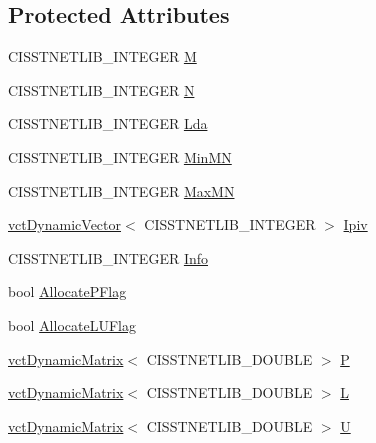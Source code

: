 \subsection*{Protected Attributes}
\begin{DoxyCompactItemize}
\item 
C\+I\+S\+S\+T\+N\+E\+T\+L\+I\+B\+\_\+\+I\+N\+T\+E\+G\+E\+R \hyperlink{classnmr_l_u_solver_ac73ea71a8da30d187017a98e2bcb0e51}{M}
\item 
C\+I\+S\+S\+T\+N\+E\+T\+L\+I\+B\+\_\+\+I\+N\+T\+E\+G\+E\+R \hyperlink{classnmr_l_u_solver_ad757f79f286e11fa14ff4890acfc3ac0}{N}
\item 
C\+I\+S\+S\+T\+N\+E\+T\+L\+I\+B\+\_\+\+I\+N\+T\+E\+G\+E\+R \hyperlink{classnmr_l_u_solver_a11c2f5c7c596efaaa06b6f8df190b0c6}{Lda}
\item 
C\+I\+S\+S\+T\+N\+E\+T\+L\+I\+B\+\_\+\+I\+N\+T\+E\+G\+E\+R \hyperlink{classnmr_l_u_solver_aeeaab59323aae5580e166a6ad23e75d2}{Min\+M\+N}
\item 
C\+I\+S\+S\+T\+N\+E\+T\+L\+I\+B\+\_\+\+I\+N\+T\+E\+G\+E\+R \hyperlink{classnmr_l_u_solver_ac59a365a23fdd52c40d4076efc5f0944}{Max\+M\+N}
\item 
\hyperlink{classvct_dynamic_vector}{vct\+Dynamic\+Vector}$<$ C\+I\+S\+S\+T\+N\+E\+T\+L\+I\+B\+\_\+\+I\+N\+T\+E\+G\+E\+R $>$ \hyperlink{classnmr_l_u_solver_ad1cd8e579ea67dbebc1586400a82ee58}{Ipiv}
\item 
C\+I\+S\+S\+T\+N\+E\+T\+L\+I\+B\+\_\+\+I\+N\+T\+E\+G\+E\+R \hyperlink{classnmr_l_u_solver_a7a5bf0600413afceac134473b0651698}{Info}
\item 
bool \hyperlink{classnmr_l_u_solver_aedb65694fb1672b67cf4b1e731e3438a}{Allocate\+P\+Flag}
\item 
bool \hyperlink{classnmr_l_u_solver_a34bf65decc10c0ce0b20697404dcb328}{Allocate\+L\+U\+Flag}
\item 
\hyperlink{classvct_dynamic_matrix}{vct\+Dynamic\+Matrix}$<$ C\+I\+S\+S\+T\+N\+E\+T\+L\+I\+B\+\_\+\+D\+O\+U\+B\+L\+E $>$ \hyperlink{classnmr_l_u_solver_a221f406c2d7cc55ed7f077a2e4c990cb}{P}
\item 
\hyperlink{classvct_dynamic_matrix}{vct\+Dynamic\+Matrix}$<$ C\+I\+S\+S\+T\+N\+E\+T\+L\+I\+B\+\_\+\+D\+O\+U\+B\+L\+E $>$ \hyperlink{classnmr_l_u_solver_aaf0f1fb37af9ab5edff6fcb7f8244de4}{L}
\item 
\hyperlink{classvct_dynamic_matrix}{vct\+Dynamic\+Matrix}$<$ C\+I\+S\+S\+T\+N\+E\+T\+L\+I\+B\+\_\+\+D\+O\+U\+B\+L\+E $>$ \hyperlink{classnmr_l_u_solver_a02868ccfffd41664e2883641de95650f}{U}
\end{DoxyCompactItemize}


